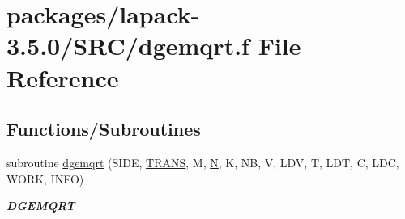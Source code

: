 \hypertarget{dgemqrt_8f}{}\section{packages/lapack-\/3.5.0/\+S\+R\+C/dgemqrt.f File Reference}
\label{dgemqrt_8f}
\subsection*{Functions/\+Subroutines}
\begin{DoxyCompactItemize}
\item 
subroutine \hyperlink{group__doubleGEcomputational_gaf55d7b3137b198647461d429a7e9b2c6}{dgemqrt} (S\+I\+D\+E, \hyperlink{superlu__enum__consts_8h_a0c4e17b2d5cea33f9991ccc6a6678d62a1f61e3015bfe0f0c2c3fda4c5a0cdf58}{T\+R\+A\+N\+S}, M, \hyperlink{polmisc_8c_a0240ac851181b84ac374872dc5434ee4}{N}, K, N\+B, V, L\+D\+V, T, L\+D\+T, C, L\+D\+C, W\+O\+R\+K, I\+N\+F\+O)
\begin{DoxyCompactList}\small\item\em {\bfseries D\+G\+E\+M\+Q\+R\+T} \end{DoxyCompactList}\end{DoxyCompactItemize}
